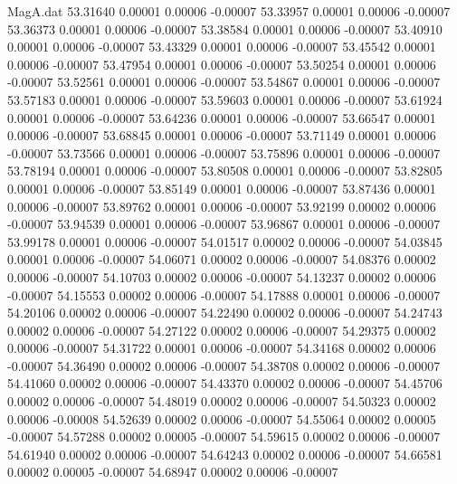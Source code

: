 \begin{filecontents}{MagA.dat}
  53.31640    0.00001    0.00006   -0.00007
  53.33957    0.00001    0.00006   -0.00007
  53.36373    0.00001    0.00006   -0.00007
  53.38584    0.00001    0.00006   -0.00007
  53.40910    0.00001    0.00006   -0.00007
  53.43329    0.00001    0.00006   -0.00007
  53.45542    0.00001    0.00006   -0.00007
  53.47954    0.00001    0.00006   -0.00007
  53.50254    0.00001    0.00006   -0.00007
  53.52561    0.00001    0.00006   -0.00007
  53.54867    0.00001    0.00006   -0.00007
  53.57183    0.00001    0.00006   -0.00007
  53.59603    0.00001    0.00006   -0.00007
  53.61924    0.00001    0.00006   -0.00007
  53.64236    0.00001    0.00006   -0.00007
  53.66547    0.00001    0.00006   -0.00007
  53.68845    0.00001    0.00006   -0.00007
  53.71149    0.00001    0.00006   -0.00007
  53.73566    0.00001    0.00006   -0.00007
  53.75896    0.00001    0.00006   -0.00007
  53.78194    0.00001    0.00006   -0.00007
  53.80508    0.00001    0.00006   -0.00007
  53.82805    0.00001    0.00006   -0.00007
  53.85149    0.00001    0.00006   -0.00007
  53.87436    0.00001    0.00006   -0.00007
  53.89762    0.00001    0.00006   -0.00007
  53.92199    0.00002    0.00006   -0.00007
  53.94539    0.00001    0.00006   -0.00007
  53.96867    0.00001    0.00006   -0.00007
  53.99178    0.00001    0.00006   -0.00007
  54.01517    0.00002    0.00006   -0.00007
  54.03845    0.00001    0.00006   -0.00007
  54.06071    0.00002    0.00006   -0.00007
  54.08376    0.00002    0.00006   -0.00007
  54.10703    0.00002    0.00006   -0.00007
  54.13237    0.00002    0.00006   -0.00007
  54.15553    0.00002    0.00006   -0.00007
  54.17888    0.00001    0.00006   -0.00007
  54.20106    0.00002    0.00006   -0.00007
  54.22490    0.00002    0.00006   -0.00007
  54.24743    0.00002    0.00006   -0.00007
  54.27122    0.00002    0.00006   -0.00007
  54.29375    0.00002    0.00006   -0.00007
  54.31722    0.00001    0.00006   -0.00007
  54.34168    0.00002    0.00006   -0.00007
  54.36490    0.00002    0.00006   -0.00007
  54.38708    0.00002    0.00006   -0.00007
  54.41060    0.00002    0.00006   -0.00007
  54.43370    0.00002    0.00006   -0.00007
  54.45706    0.00002    0.00006   -0.00007
  54.48019    0.00002    0.00006   -0.00007
  54.50323    0.00002    0.00006   -0.00008
  54.52639    0.00002    0.00006   -0.00007
  54.55064    0.00002    0.00005   -0.00007
  54.57288    0.00002    0.00005   -0.00007
  54.59615    0.00002    0.00006   -0.00007
  54.61940    0.00002    0.00006   -0.00007
  54.64243    0.00002    0.00006   -0.00007
  54.66581    0.00002    0.00005   -0.00007
  54.68947    0.00002    0.00006   -0.00007

\end{filecontents}
